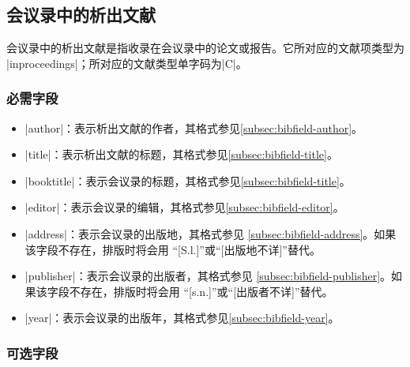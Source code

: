 
\subsection{会议录中的析出文献}\label{subsec:bibtype-inproceedings}

会议录中的析出文献是指收录在会议录中的论文或报告。它所对应的{\BibTeX}文献项类型为
|inproceedings|；所对应的文献类型单字码为|C|\cite{gbt3469-1983}。

\subsubsection{必需字段}

\begin{itemize}
\item |author|：表示析出文献的作者，其格式参见\ref{subsec:bibfield-author}。
\item |title|：表示析出文献的标题，其格式参见\ref{subsec:bibfield-title}。
\item |booktitle|：表示会议录的标题，其格式参见\ref{subsec:bibfield-title}。
\item |editor|：表示会议录的编辑，其格式参见\ref{subsec:bibfield-editor}。
\item |address|：表示会议录的出版地，其格式参见
  \ref{subsec:bibfield-address}。如果该字段不存在，{\BibTeX}排版时将会用
  ``[S.l.]''或``[出版地不详]''替代。
\item |publisher|：表示会议录的出版者，其格式参见
  \ref{subsec:bibfield-publisher}。如果该字段不存在，{\BibTeX}排版时将会用
  ``[s.n.]''或``[出版者不详]''替代。
\item |year|：表示会议录的出版年，其格式参见\ref{subsec:bibfield-year}。
\end{itemize}

\subsubsection{可选字段}

